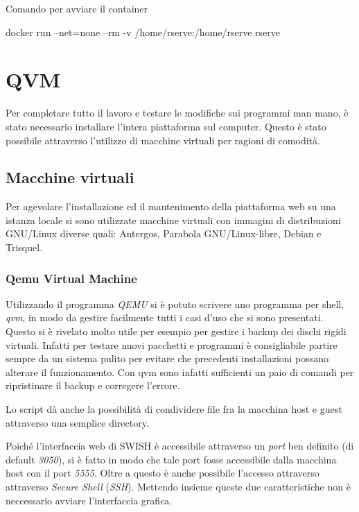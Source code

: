 \documentclass[10pt,titlepage,twoside,a4paper]{report}
\newenvironment{code}{\singlespacing\captionsetup{type=listing}}{}
\begin{document}
\begin{code}
    \caption{Comando per avviare il container}
    \begin{shellcode*}{}
docker run --net=none --rm -v /home/rserve:/home/rserve rserve
    \end{shellcode*}
    \label{lst:dockerruncommand}
\end{code}


\section{QVM}
Per completare tutto il lavoro e testare le modifiche sui programmi man 
mano, è stato necessario installare l'intera piattaforma sul computer. 
Questo è stato possibile attraverso l'utilizzo di macchine virtuali 
per ragioni di comodità.

\subsection{Macchine virtuali}
Per agevolare l'installazione ed il mantenimento della piattaforma web su una 
istanza locale si sono utilizzate macchine virtuali con immagini di 
distribuzioni GNU/Linux diverse quali: Antergos, Parabola GNU/Linux-libre, 
Debian e Trisquel.

\subsubsection{Qemu Virtual Machine}
Utilizzando il programma \emph{QEMU}\cite{qemu} si è potuto scrivere uno 
programma per 
shell, \emph{qvm}, in modo da gestire facilmente tutti i casi d'uso che si 
sono presentati\cite{qvm}. Questo si è rivelato molto utile per esempio per 
gestire i backup dei dischi rigidi virtuali. Infatti per testare nuovi 
pacchetti e programmi è consigliabile partire sempre da un sistema pulito
per evitare che precedenti installazioni possano alterare il funzionamento.
Con qvm sono infatti sufficienti un paio di comandi per ripristinare il 
backup e corregere l'errore.

Lo script dà anche la possibilità di condividere file fra la macchina host 
e guest attraverso una semplice directory.

Poiché l'interfaccia web di SWISH è accessibile attraverso un \emph{port} 
ben definito (di default \emph{3050}), si è fatto in modo che tale port 
fosse accessibile dalla macchina host con il port \emph{5555}. Oltre a questo 
è anche possibile l'accesso attraverso attraverso \emph{Secure 
Shell} (\emph{SSH}). Mettendo insieme queste due caratteristiche non è 
neccessario avviare l'interfaccia grafica.
\end{document}

